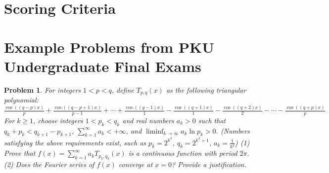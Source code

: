 \documentclass[11pt]{article}
\numberwithin{equation}{section}
\newtheorem{thm}{Problem}
\begin{document}



\newpage
\appendix

\section{Scoring Criteria}


\begin{table}[h]
\label{tab:score_crtr}
\centering
{}
\caption{Scoring criteria for the undergraduate exams.}
\end{table}


\section{Example Problems from PKU Undergraduate Final Exams}\label{sec:exam}


\begin{thm}
For integers $1 < p < q$, define $T_{p, q}(x)$ as the following triangular polynomial: $\frac{\cos((q-p)x)}{p} + \frac{\cos((q-p+1)x)}{p-1} + \cdots + \frac{\cos((q-1)x)}{1} - \frac{\cos((q+1)x)}{1} - \frac{\cos((q+2)x)}{2} - \cdots - \frac{\cos((q+p)x)}{p}$ For $k \geq 1$, choose integers $1 < p_k < q_k$ and real numbers $a_k > 0$ such that $q_k + p_k < q_{k+1} - p_{k+1}$, $\sum_{k=1}^{\infty} a_k < +\infty$, and $\liminf_{k \to \infty} a_k \ln p_k > 0$. (Numbers satisfying the above requirements exist, such as $p_k = 2^{k^3}$, $q_k = 2^{k^3 + 1}$, $a_k = \frac{1}{k^2}$) (1) Prove that $f(x) = \sum_{k=1}^{\infty} a_k T_{p_k, q_k}(x)$ is a continuous function with period $2\pi$. (2) Does the Fourier series of $f(x)$ converge at $x = 0$? Provide a justification.
\end{thm}
\end{document}
